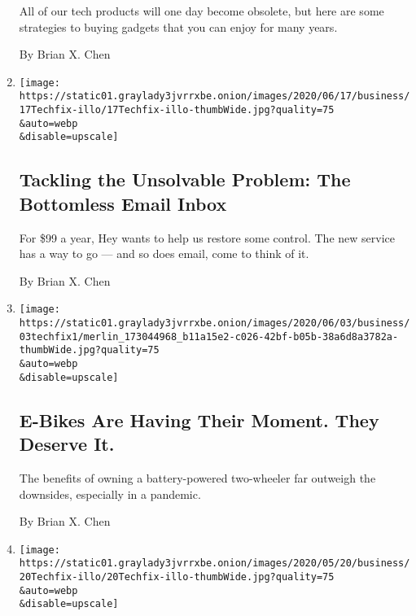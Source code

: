 \begin{enumerate}
  All of our tech products will one day become obsolete, but here are
  some strategies to buying gadgets that you can enjoy for many years.

  By Brian X. Chen
\item
  \href{/2020/06/17/technology/personaltech/hey-email-service-screening.html}{}

  \texttt{[image: https://static01.graylady3jvrrxbe.onion/images/2020/06/17/business/17Techfix-illo/17Techfix-illo-thumbWide.jpg?quality=75\\\&auto=webp\\\&disable=upscale]}

  \hypertarget{tackling-the-unsolvable-problem-the-bottomless-email-inbox}{%
  \subsection{Tackling the Unsolvable Problem: The Bottomless Email
  Inbox}\label{tackling-the-unsolvable-problem-the-bottomless-email-inbox}}

  For \$99 a year, Hey wants to help us restore some control. The new
  service has a way to go --- and so does email, come to think of it.

  By Brian X. Chen
\item
  \href{/2020/06/03/technology/personaltech/e-bikes-are-having-their-moment-they-deserve-it.html}{}

  \texttt{[image: https://static01.graylady3jvrrxbe.onion/images/2020/06/03/business/03techfix1/merlin\_173044968\_b11a15e2-c026-42bf-b05b-38a6d8a3782a-thumbWide.jpg?quality=75\\\&auto=webp\\\&disable=upscale]}

  \hypertarget{e-bikes-are-having-their-moment-they-deserve-it}{%
  \subsection{E-Bikes Are Having Their Moment. They Deserve
  It.}\label{e-bikes-are-having-their-moment-they-deserve-it}}

  The benefits of owning a battery-powered two-wheeler far outweigh the
  downsides, especially in a pandemic.

  By Brian X. Chen
\item
  \href{/2020/05/20/technology/personaltech/slow-internet-speeds.html}{}

  \texttt{[image: https://static01.graylady3jvrrxbe.onion/images/2020/05/20/business/20Techfix-illo/20Techfix-illo-thumbWide.jpg?quality=75\\\&auto=webp\\\&disable=upscale]}

  \hypertarget{everything-you-need-to-know-about-slow-internet-speeds}{%
}
\end{enumerate}

